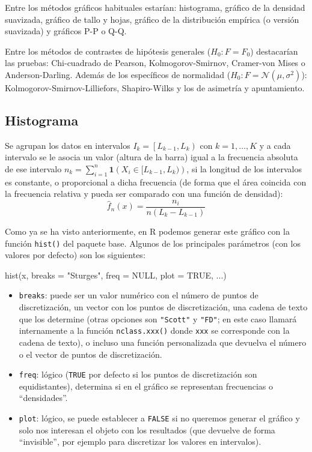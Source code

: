 \documentclass[
]{book}
\newenvironment{Shaded}{\begin{snugshade}}{\end{snugshade}}
\newcommand{\AttributeTok}[1]{\textcolor[rgb]{0.77,0.63,0.00}{#1}}
\newcommand{\ConstantTok}[1]{\textcolor[rgb]{0.00,0.00,0.00}{#1}}
\newcommand{\FunctionTok}[1]{\textcolor[rgb]{0.00,0.00,0.00}{#1}}
\newcommand{\NormalTok}[1]{#1}
\newcommand{\StringTok}[1]{\textcolor[rgb]{0.31,0.60,0.02}{#1}}
\theoremstyle{break}
\theoremstyle{nonumberplain}
\begin{document}
Entre los métodos gráficos habituales estarían: histograma, gráfico de la densidad suavizada, gráfico de tallo y hojas, gráfico de la distribución empírica (o versión suavizada) y gráficos P-P o Q-Q.

Entre los métodos de contrastes de hipótesis generales (\(H_0:F=F_0\)) destacarían las pruebas: Chi-cuadrado de Pearson, Kolmogorov-Smirnov, Cramer-von Mises o Anderson-Darling.
Además de los específicos de normalidad (\(H_0:F= \mathcal{N}(\mu,\sigma^2)\)): Kolmogorov-Smirnov-Lilliefors, Shapiro-Wilks y los de asimetría y apuntamiento.

\hypertarget{histograma}{%
\subsection{Histograma}\label{histograma}}

Se agrupan los datos en intervalos \(I_{k}=\left[ L_{k-1},L_{k}\right)\) con \(k=1, \ldots, K\) y a cada intervalo se le asocia un valor (altura de la barra) igual a la frecuencia absoluta de ese intervalo \(n_k = \sum_{i=1}^{n}\mathbf{1}\left( X_i \in [L_{k-1},L_{k}) \right)\), si la longitud de los intervalos es constante, o proporcional a dicha frecuencia (de forma que el área coincida con la frecuencia relativa y pueda ser comparado con una función de densidad):
\[\hat{f}_n(x)=\frac{n_{i}}{n\left(  L_{k}-L_{k-1}\right)}\]

Como ya se ha visto anteriormente, en R podemos generar este gráfico con la función \texttt{hist()} del paquete base.
Algunos de los principales parámetros (con los valores por defecto) son los siguientes:

\begin{Shaded}
\begin{Highlighting}[]
\FunctionTok{hist}\NormalTok{(x, }\AttributeTok{breaks =} \StringTok{"Sturges"}\NormalTok{, }\AttributeTok{freq =} \ConstantTok{NULL}\NormalTok{, }\AttributeTok{plot =} \ConstantTok{TRUE}\NormalTok{, ...)}
\end{Highlighting}
\end{Shaded}

\begin{itemize}
\item
  \texttt{breaks}: puede ser un valor numérico con el número de puntos de discretización, un vector con los puntos de discretización, una cadena de texto que los determine (otras opciones son \texttt{"Scott"} y \texttt{"FD"}; en este caso llamará internamente a la función \texttt{nclass.xxx()} donde \texttt{xxx} se corresponde con la cadena de texto), o incluso una función personalizada que devuelva el número o el vector de puntos de discretización.
\item
  \texttt{freq}: lógico (\texttt{TRUE} por defecto si los puntos de discretización son equidistantes), determina si en el gráfico se representan frecuencias o ``densidades''.
\item
  \texttt{plot}: lógico, se puede establecer a \texttt{FALSE} si no queremos generar el gráfico y solo nos interesan el objeto con los resultados (que devuelve de forma ``invisible'', por ejemplo para discretizar los valores en intervalos).
\end{itemize}
\end{document}
